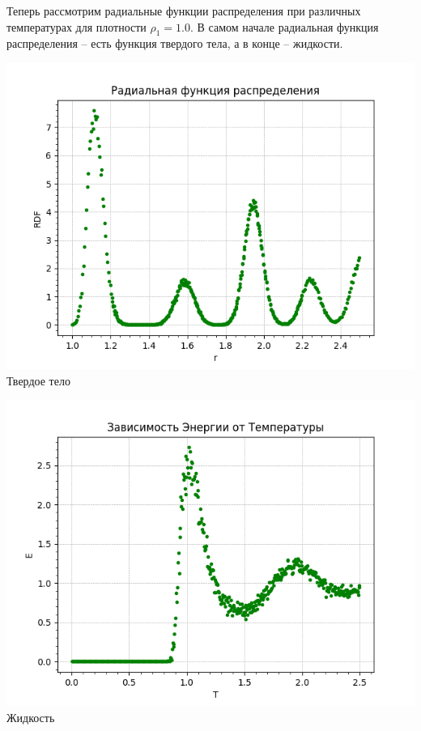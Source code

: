 Теперь рассмотрим радиальные функции распределения при различных температурах для плотности $\rho_1 = 1.0$. В самом начале радиальная функция распределения -- есть функция твердого тела, а в конце -- жидкости. 

\begin{minipage}{0.47\textwidth}
    \begin{center}
        \includegraphics[width=0.9\linewidth]{3.png}\\
        Твердое тело
    \end{center}
   
\end{minipage}
\begin{minipage}{0.07\textwidth}
\begin{center}

\Longrightarrow

\end{center}
\end{minipage}
\begin{minipage}{0.47\textwidth}
    \begin{center}
        \includegraphics[width=0.9\linewidth]{4.png}\\
        Жидкость
    \end{center}
\end{minipage}

